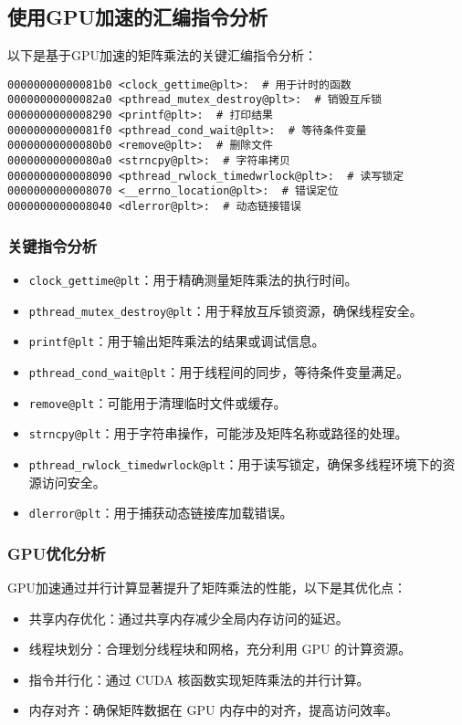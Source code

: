 \documentclass[a4paper,12pt]{ctexart}
\begin{document}
\subsection{使用GPU加速的汇编指令分析}
以下是基于GPU加速的矩阵乘法的关键汇编指令分析：

\begin{lstlisting}[caption={GPU加速的关键汇编指令}]
00000000000081b0 <clock_gettime@plt>:  # 用于计时的函数
00000000000082a0 <pthread_mutex_destroy@plt>:  # 销毁互斥锁
0000000000008290 <printf@plt>:  # 打印结果
00000000000081f0 <pthread_cond_wait@plt>:  # 等待条件变量
00000000000080b0 <remove@plt>:  # 删除文件
00000000000080a0 <strncpy@plt>:  # 字符串拷贝
0000000000008090 <pthread_rwlock_timedwrlock@plt>:  # 读写锁定
0000000000008070 <__errno_location@plt>:  # 错误定位
0000000000008040 <dlerror@plt>:  # 动态链接错误
\end{lstlisting}

\subsubsection{关键指令分析}
\begin{itemize}
    \item \texttt{clock\_gettime@plt}：用于精确测量矩阵乘法的执行时间。
    \item \texttt{pthread\_mutex\_destroy@plt}：用于释放互斥锁资源，确保线程安全。
    \item \texttt{printf@plt}：用于输出矩阵乘法的结果或调试信息。
    \item \texttt{pthread\_cond\_wait@plt}：用于线程间的同步，等待条件变量满足。
    \item \texttt{remove@plt}：可能用于清理临时文件或缓存。
    \item \texttt{strncpy@plt}：用于字符串操作，可能涉及矩阵名称或路径的处理。
    \item \texttt{pthread\_rwlock\_timedwrlock@plt}：用于读写锁定，确保多线程环境下的资源访问安全。
    \item \texttt{dlerror@plt}：用于捕获动态链接库加载错误。
\end{itemize}

\subsubsection{GPU优化分析}
GPU加速通过并行计算显著提升了矩阵乘法的性能，以下是其优化点：
\begin{itemize}
    \item 共享内存优化：通过共享内存减少全局内存访问的延迟。
    \item 线程块划分：合理划分线程块和网格，充分利用 GPU 的计算资源。
    \item 指令并行化：通过 CUDA 核函数实现矩阵乘法的并行计算。
    \item 内存对齐：确保矩阵数据在 GPU 内存中的对齐，提高访问效率。
\end{itemize}
\end{document}
